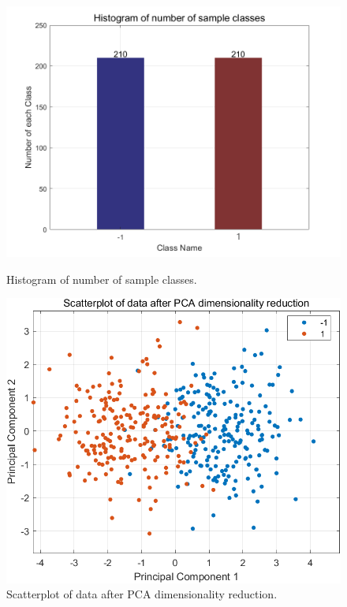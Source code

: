 \documentclass[12pt, onecolumn]{article}
\begin{document}
\begin{figure}[htbp]
\centering
\begin{minipage}[b]{0.48\linewidth}
\includegraphics[width=\linewidth]{Bar.png}
\caption{Histogram of number of sample classes.}
\label{fig:histogram}
\end{minipage}
\hfill
\begin{minipage}[b]{0.48\linewidth}
\includegraphics[width=\linewidth]{PCA降维分布1.png}
\caption{Scatterplot of data after PCA dimensionality reduction.}
\label{fig:pca_scatter}
\end{minipage}
\end{figure}
\end{document}

